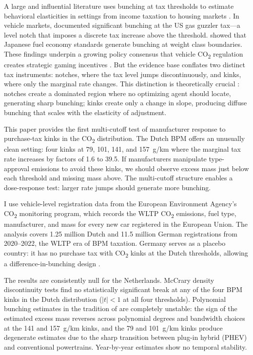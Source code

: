 \documentclass[12pt]{article}
\begin{document}
A large and influential literature uses bunching at tax thresholds to estimate behavioral elasticities in settings from income taxation \citep{saez2010, chetty2011} to housing markets \citep{best2014}. In vehicle markets, \citet{sallee2012} documented significant bunching at the US gas guzzler tax---a level notch that imposes a discrete tax increase above the threshold. \citet{ito2018} showed that Japanese fuel economy standards generate bunching at weight class boundaries. These findings underpin a growing policy consensus that vehicle CO\textsubscript{2} regulation creates strategic gaming incentives \citep{reynaert2021, grigolon2018}. But the evidence base conflates two distinct tax instruments: notches, where the tax level jumps discontinuously, and kinks, where only the marginal rate changes. This distinction is theoretically crucial \citep{kleven2016}: notches create a dominated region where no optimizing agent should locate, generating sharp bunching; kinks create only a change in slope, producing diffuse bunching that scales with the elasticity of adjustment.

This paper provides the first multi-cutoff test of manufacturer response to purchase-tax kinks in the CO\textsubscript{2} distribution. The Dutch BPM offers an unusually clean setting: four kinks at 79, 101, 141, and 157~g/km where the marginal tax rate increases by factors of 1.6 to 39.5. If manufacturers manipulate type-approval emissions to avoid these kinks, we should observe excess mass just below each threshold and missing mass above. The multi-cutoff structure enables a dose-response test: larger rate jumps should generate more bunching.

I use vehicle-level registration data from the European Environment Agency's CO\textsubscript{2} monitoring program, which records the WLTP CO\textsubscript{2} emissions, fuel type, manufacturer, and mass for every new car registered in the European Union. The analysis covers 1.25 million Dutch and 11.5 million German registrations from 2020--2022, the WLTP era of BPM taxation. Germany serves as a placebo country: it has no purchase tax with CO\textsubscript{2} kinks at the Dutch thresholds, allowing a difference-in-bunching design \citep{kleven2013}.

The results are consistently null for the Netherlands. McCrary density discontinuity tests \citep{mccrary2008} find no statistically significant break at any of the four BPM kinks in the Dutch distribution ($|t| < 1$ at all four thresholds). Polynomial bunching estimates in the tradition of \citet{chetty2011} are completely unstable: the sign of the estimated excess mass reverses across polynomial degrees and bandwidth choices at the 141 and 157~g/km kinks, and the 79 and 101~g/km kinks produce degenerate estimates due to the sharp transition between plug-in hybrid (PHEV) and conventional powertrains. Year-by-year estimates show no temporal stability.
\end{document}
